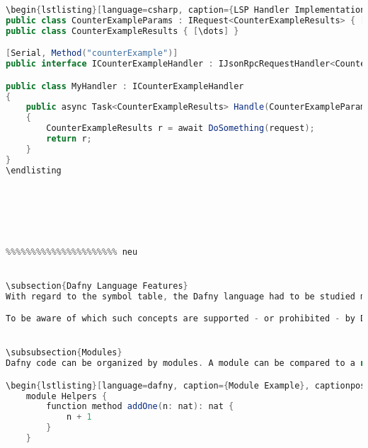 \begin{lstlisting}[language=csharp, caption={LSP Handler Implementation}, captionpos=b, label={lst:lsphandler}]
\begin{lstlisting}[language=csharp, caption={LSP Handler Implementation}, captionpos=b, label={lst:lsphandler}]
public class CounterExampleParams : IRequest<CounterExampleResults> { [\dots] }
public class CounterExampleResults { [\dots] }

[Serial, Method("counterExample")]
public interface ICounterExampleHandler : IJsonRpcRequestHandler<CounterExampleParams, CounterExampleResults> { }

public class MyHandler : ICounterExampleHandler
{
    public async Task<CounterExampleResults> Handle(CounterExampleParams request, CancellationToken c)
    {
        CounterExampleResults r = await DoSomething(request);
        return r;
    }
}
\endlisting






%%%%%%%%%%%%%%%%%%%%%% neu


\subsection{Dafny Language Features}
With regard to the symbol table, the Dafny language had to be studied more in detail. For example, shadowing describes the existence of multiple variables with the same name, but different visibility scopes. This is highly relevant for the construction of a symbol table.

To be aware of which such concepts are supported - or prohibited - by Dafny, we studied the Dafny Reference Guide \cite{dafnyReferenceManual}. This chapter provides the reader with the most relevant concepts with regard to the symbol table. 


\subsubsection{Modules}
Dafny code can be organized by modules. A module can be compared to a namespace in \Csharp or C++. Modules can also be nested. To use a class, method or variable defined in another module, the user has three options. Imagine a method \code{addOne} defined in a module \code{Helpers}.

\begin{lstlisting}[language=dafny, caption={Module Example}, captionpos=b, label={lst:shadowing}]
    module Helpers {
        function method addOne(n: nat): nat {
            n + 1
        }
    }
\end{lstlisting}

